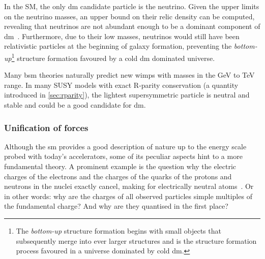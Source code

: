 In the SM, the only \gls{dm} candidate particle is the neutrino. Given the upper limits on the neutrino masses, an upper bound on their relic density can be computed, revealing that neutrinos are not abundant enough to be a dominant component of \gls{dm}~\cite{Bertone:2004pz}. Furthermore, due to their low masses, neutrinos would still have been relativistic particles at the beginning of galaxy formation, preventing the \textit{bottom-up}\footnote{The \textit{bottom-up} structure formation begins with small objects that subsequently merge into ever larger structures and is the structure formation process favoured in a universe dominated by cold \gls{dm}.} structure formation favoured by a cold \gls{dm} dominated universe.

 Many \gls{bsm} theories naturally predict new \glspl{wimp} with masses in the GeV to TeV range. In many SUSY models with exact R-parity conservation (a quantity introduced in \cref{sec:rparity}), the lightest supersymmetric particle is neutral and stable and could be a good candidate for \gls{dm}.

\subsubsection{Unification of forces}


Although the \gls{sm} provides a good description of nature up to the energy scale probed with today's accelerators, some of its peculiar aspects hint to a more fundamental theory. A prominent example is the question why the electric charges of the electrons and the charges of the quarks of the protons and neutrons in the nuclei exactly cancel, making for electrically neutral atoms~\cite{Brock:1354959}. Or in other words: why are the charges of all observed particles simple multiples of the fundamental charge? And why are they quantised in the first place?

